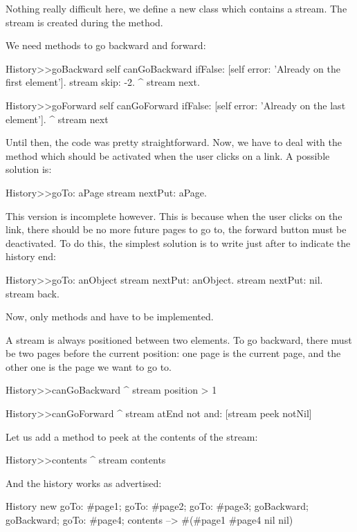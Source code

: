 \documentclass[a4paper,10pt,twoside]{book}
\begin{document}
Nothing really difficult here, we define a new class which contains a
stream. The stream is created during the  method.

We need methods to go backward and forward:

\begin{code}{}
History>>goBackward
  self canGoBackward ifFalse: [self error: 'Already on the first element'].
  stream skip: -2.
  ^ stream next.

History>>goForward
  self canGoForward ifFalse: [self error: 'Already on the last element'].
  ^ stream next
\end{code}

Until then, the code was pretty straightforward. Now, we have to deal
with the  method which should be activated when the user
clicks on a link. A possible solution is:

\begin{code}{}
History>>goTo: aPage
    stream nextPut: aPage.
\end{code}

This version is incomplete however. This is because when the user
clicks on the link, there should be no more future pages to go to,
\ie the forward button must be deactivated. To do this, the simplest
solution is to write  just after to indicate the history end:

\begin{code}{}
History>>goTo: anObject
  stream nextPut: anObject.
  stream nextPut: nil.
  stream back.
\end{code}

Now, only methods  and  have to be
implemented.

A stream is always positioned between two elements. To go backward,
there must be two pages before the current position: one page is the
current page, and the other one is the page we want to go to.

\begin{code}{}
History>>canGoBackward
  ^ stream position > 1

History>>canGoForward
  ^ stream atEnd not and: [stream peek notNil]
\end{code}

Let us add a method to peek at the contents of the stream:
\begin{code}{}
History>>contents
  ^ stream contents
\end{code}

And the history works as advertised:
\begin{code}{}
History new
	goTo: #page1;
	goTo: #page2;
	goTo: #page3;
	goBackward;
	goBackward;
	goTo: #page4;
	contents --> #(#page1 #page4 nil nil)
\end{code}
\end{document}
